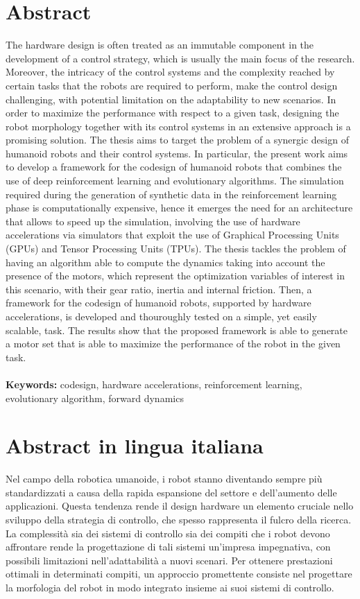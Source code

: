 \documentclass{Configuration_Files/PoliMi3i_thesis}
\begin{document}
\chapter*{Abstract}
The hardware design is often treated as an immutable component in the development of a control strategy, which is usually the main focus of the research.
Moreover, the intricacy of the control systems and the complexity reached by certain tasks that the robots are required to perform, make the control design
challenging, with potential limitation on the adaptability to new scenarios. In order to maximize the performance with respect to a given task,
designing the robot morphology together with its control systems in an extensive approach is a promising solution.
The thesis aims to target the problem of a synergic design of humanoid robots and their control systems. In particular, the present work aims
to develop a framework for the codesign of humanoid robots that combines the use of deep reinforcement learning and evolutionary algorithms.
The simulation required during the generation of synthetic data in the reinforcement learning phase is computationally expensive, hence it
emerges the need for an architecture that allows to speed up the simulation, involving the use of hardware accelerations via simulators that exploit the use of Graphical Processing Units (GPUs) and Tensor Processing Units (TPUs). The thesis tackles the
problem of having an algorithm able to compute the dynamics taking into account the presence of the motors, which represent the optimization
variables of interest in this scenario, with their gear ratio, inertia and internal friction. Then, a framework for the codesign of humanoid robots,
supported by hardware accelerations, is developed and thouroughly tested on a simple, yet easily scalable, task. The results show that the proposed
framework is able to generate a motor set that is able to maximize the performance of the robot in the given task.
\\
\\
\textbf{Keywords:} codesign, hardware accelerations, reinforcement learning, evolutionary algorithm, forward dynamics %

\chapter*{Abstract in lingua italiana}
Nel campo della robotica umanoide, i robot stanno diventando sempre più standardizzati a causa della rapida espansione del settore e dell'aumento
delle applicazioni. Questa tendenza rende il design hardware un elemento cruciale nello sviluppo della strategia di controllo, che spesso rappresenta
il fulcro della ricerca. La complessità sia dei sistemi di controllo sia dei compiti che i robot devono affrontare rende la progettazione di tali
sistemi un'impresa impegnativa, con possibili limitazioni nell'adattabilità a nuovi scenari. Per ottenere prestazioni ottimali in determinati compiti,
un approccio promettente consiste nel progettare la morfologia del robot in modo integrato insieme ai suoi sistemi di controllo.
\end{document}
